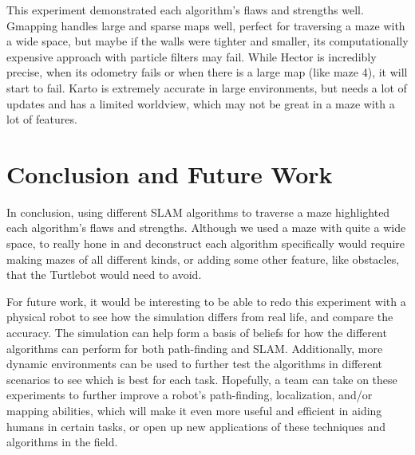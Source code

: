 \documentclass{article}
\begin{document}
This experiment demonstrated each algorithm's flaws and strengths well. Gmapping handles large and sparse maps well, perfect for traversing a maze with a wide space, but maybe if the walls were tighter and smaller, its computationally expensive approach with particle filters may fail. While Hector is incredibly precise, when its odometry fails or when there is a large map (like maze 4), it will start to fail. Karto is extremely accurate in large environments, but needs a lot of updates and has a limited worldview, which may not be great in a maze with a lot of features. 


\section{Conclusion and Future Work}

In conclusion, using different SLAM algorithms to traverse a maze highlighted each algorithm's flaws and strengths. Although we used a maze with quite a wide space, to really hone in and deconstruct each algorithm specifically would require making mazes of all different kinds, or adding some other feature, like obstacles, that the Turtlebot would need to avoid. 

For future work, it would be interesting to be able to redo this experiment with a physical robot to see how the simulation differs from real life, and compare the accuracy. The simulation can help form a basis of beliefs for how the different algorithms can perform for both path-finding and SLAM. Additionally, more dynamic environments can be used to further test the algorithms in different scenarios to see which is best for each task. Hopefully, a team can take on these experiments to further improve a robot's path-finding, localization, and/or mapping abilities, which will make it even more useful and efficient in aiding humans in certain tasks, or open up new applications of these techniques and algorithms in the field. 
\end{document}
